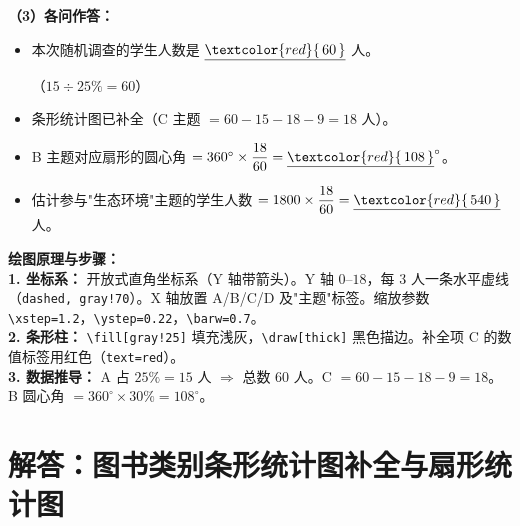 \vspace{0.4cm}
\textbf{（3）各问作答：}

\begin{itemize}
    \item[\textbf{(1)}] 本次随机调查的学生人数是 $\underline{\textcolor{red}{\,60\,}}$ 人。

    （$15 \div 25\% = 60$）

    \item[\textbf{(2)}] 条形统计图已补全（C 主题 $= 60 - 15 - 18 - 9 = 18$ 人）。

    \item[\textbf{(3)}] B 主题对应扇形的圆心角 $= 360^\circ \times \dfrac{18}{60} = \underline{\textcolor{red}{\,108\,}}^\circ$。

    \item[\textbf{(4)}] 估计参与"生态环境"主题的学生人数 $= 1800 \times \dfrac{18}{60} = \underline{\textcolor{red}{\,540\,}}$ 人。
\end{itemize}

\vspace{0.4cm}
{\small\color{blue!70!black}
\textbf{绘图原理与步骤：}\\
\textbf{1. 坐标系：} 开放式直角坐标系（Y 轴带箭头）。Y 轴 $0$--$18$，每 $3$ 人一条水平虚线（\texttt{dashed, gray!70}）。X 轴放置 A/B/C/D 及"主题"标签。缩放参数 \texttt{\textbackslash{}xstep=1.2}，\texttt{\textbackslash{}ystep=0.22}，\texttt{\textbackslash{}barw=0.7}。\\
\textbf{2. 条形柱：} \texttt{\textbackslash{}fill[gray!25]} 填充浅灰，\texttt{\textbackslash{}draw[thick]} 黑色描边。补全项 C 的数值标签用红色（\texttt{text=red}）。\\
\textbf{3. 数据推导：} A 占 $25\% = 15$ 人 $\Rightarrow$ 总数 $60$ 人。C $= 60 - 15 - 18 - 9 = 18$。B 圆心角 $= 360^\circ \times 30\% = 108^\circ$。
}

\newpage



\newpage

\section{解答：图书类别条形统计图补全与扇形统计图}

\vspace{0.6cm}


